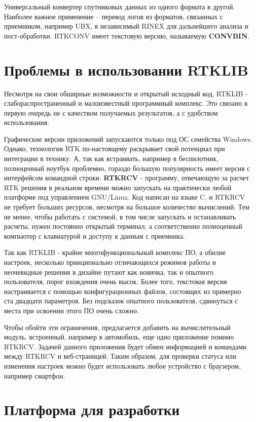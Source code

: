 Универсальный конвертер спутниковых данных из одного формата в другой. Наиболее важное применение – перевод логов из форматов, связанных с приемником, например UBX, в независимый RINEX для дальнейшего анализа и пост-обработки. RTKCONV имеет текстовую версию, называемую \textbf{CONVBIN}.

\section{Проблемы в использовании RTKLIB} \label{sect1_3}

Несмотря на свои обширные возможности и открытый исходный код, RTKLIB - слабораспространенный и малоизвестный программный комплекс. Это связано в первую очередь не с качеством получаемых результатов, а с удобством использования.

Графические версии приложений запускаются только под ОС семейства Windows. Однако, технология RTK по-настоящему раскрывает свой потенциал при интеграции в технику. А, так как встраивать, например в беспилотник, полноценный ноутбук проблемно, гораздо большую популярность имеет версия с интерфейсом командной строки. \textbf{RTKRCV} - программу, отвечающую за расчет RTK решения в реальном времени можно запускать на практически любой платформе под управлением GNU/Linux. Код написан на языке C, и RTKRCV не требует больших ресурсов, несмотря на большое количество вычислений. Тем не менее, чтобы работать с системой, в том числе запускать и останавливать расчеты, нужен постоянно открытый терминал, а соответственно полноценный компьютер с клавиатурой и доступу к данным с приемника.

Так как RTKLIB - крайне многофункциональный комплекс ПО, а обилие настроек, несколько принципиально отличающихся режимов работы и неочевидные решения в дизайне путают как новичка, так и опытного пользователя, порог вхождения очень высок. Более того, текстовая версия настраивается с помощью конфигурационных файлов, состоящих из примерно ста двадцати параметров. Без подсказок опытного пользователя, сдвинуться с места при освоении этого ПО очень сложно.

Чтобы обойти эти ограничения, предлагается добавить на вычислительный модуль, встроенный, например в автомобиль, еще одно приложение помимо RTKRCV. Задачей данного приложения будет обмен информацией и командами между RTKRCV и веб-страницей. Таким образом, для проверки статуса или изменения настроек можно будет использовать любое устройство с браузером, например смартфон.

\section{Платформа для разработки} \label{sect1_4}

